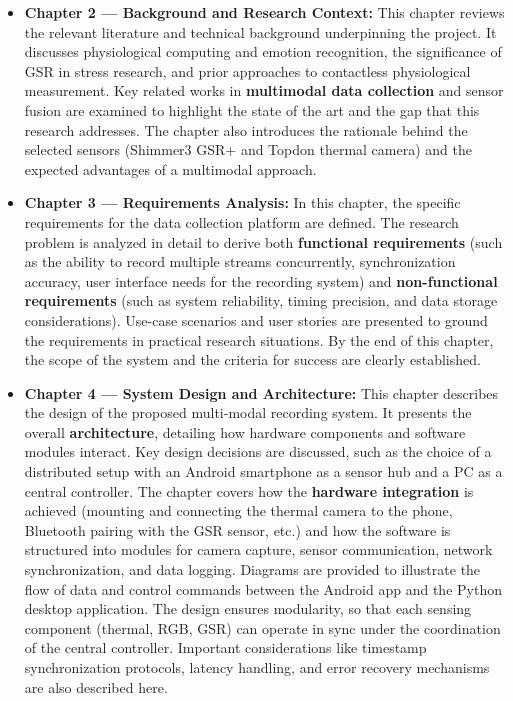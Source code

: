 \begin{itemize}
\item \textbf{Chapter 2 --- Background and Research Context:} This chapter reviews
  the relevant literature and technical background underpinning the
  project. It discusses physiological computing and emotion recognition,
  the significance of GSR in stress research, and prior approaches to
  contactless physiological measurement. Key related works in
  \textbf{multimodal data collection} and sensor fusion are examined to
  highlight the state of the art and the gap that this research
  addresses. The chapter also introduces the rationale behind the
  selected sensors (Shimmer3 GSR+ and Topdon thermal camera) and the
  expected advantages of a multimodal approach.

\item \textbf{Chapter 3 --- Requirements Analysis:} In this chapter, the specific
  requirements for the data collection platform are defined. The
  research problem is analyzed in detail to derive both \textbf{functional
  requirements} (such as the ability to record multiple streams
  concurrently, synchronization accuracy, user interface needs for the
  recording system) and \textbf{non-functional requirements} (such as system
  reliability, timing precision, and data storage considerations).
  Use-case scenarios and user stories are presented to ground the
  requirements in practical research situations. By the end of this
  chapter, the scope of the system and the criteria for success are
  clearly established.

\item \textbf{Chapter 4 --- System Design and Architecture:} This chapter
  describes the design of the proposed multi-modal recording system. It
  presents the overall \textbf{architecture}, detailing how hardware
  components and software modules interact. Key design decisions are
  discussed, such as the choice of a distributed setup with an Android
  smartphone as a sensor hub and a PC as a central
  controller\cite{ref16}.
  The chapter covers how the \textbf{hardware integration} is achieved
  (mounting and connecting the thermal camera to the phone, Bluetooth
  pairing with the GSR sensor, etc.) and how the software is structured
  into modules for camera capture, sensor communication, network
  synchronization, and data logging. Diagrams are provided to illustrate
  the flow of data and control commands between the Android app and the
  Python desktop application. The design ensures modularity, so that
  each sensing component (thermal, RGB, GSR) can operate in sync under
  the coordination of the central controller. Important considerations
  like timestamp synchronization protocols, latency handling, and error
  recovery mechanisms are also described here.


\end{itemize}
